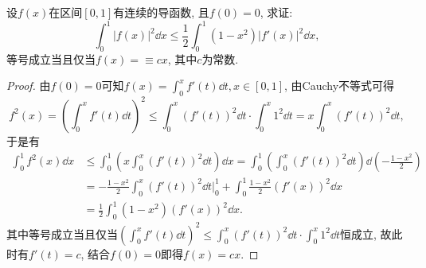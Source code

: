设\(f(x)\)在区间\([0,1]\)有连续的导函数, 且\(f(0)=0\), 求证:\[\int_{0}^{1}|f(x)|^2\dd x\leqslant\frac{1}{2}\int_{0}^{1}(1-x^2)|f'(x)|^2\dd x,\]等号成立当且仅当\(f(x)=\equiv cx\), 其中\(c\)为常数.
\begin{proof}
由\(f(0)=0\)可知\(f(x)=\int_{0}^{x}f'(t)\dd t,x\in[0,1]\), 由Cauchy不等式可得\[f^2(x)=\left(\int_{0}^{x}f'(t)\dd t\right)^2\leqslant \int_{0}^{x}\left(f'(t)\right)^2\dd t\cdot\int_{0}^{x}1^2\dd t=x\int_{0}^{x}\left(f'(t)\right)^2\dd t,\]
于是有\[\begin{split}
\int_{0}^{1}f^2(x)\dd x&\leqslant\int_{0}^{1}\left(x\int_{0}^{x}\left(f'(t)\right)^2\dd t\right)\dd x=\int_{0}^{1}\left(\int_{0}^{x}\left(f'(t)\right)^2\dd t\right)\dd\left(-\frac{1-x^2}{2}\right)\\
&=-\frac{1-x^2}{2}\int_{0}^{x}\left(f'(t)\right)^2\dd t\Big|_0^1+\int_{0}^{1}\frac{1-x^2}{2}\left(f'(x)\right)^2\dd x\\&=\frac{1}{2}\int_{0}^{1}(1-x^2)\left(f'(x)\right)^2\dd x.
\end{split}\]
其中等号成立当且仅当\(\left(\int_{0}^{x}f'(t)\dd t\right)^2\leqslant \int_{0}^{x}\left(f'(t)\right)^2\dd t\cdot\int_{0}^{x}1^2\dd t\)恒成立, 故此时有\(f'(t)=c\), 结合\(f(0)=0\)即得\(f(x)=cx\).
\end{proof}
